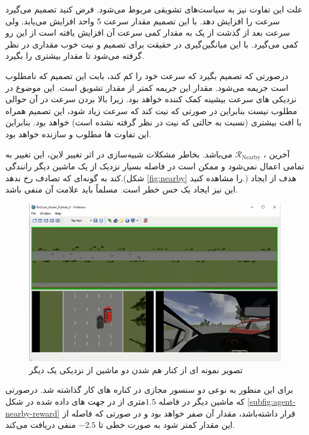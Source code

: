 علت این تفاوت نیز به سیاست‌های تشویقی مربوط می‌شود. فرض کنید  تصمیم می‌گیرد سرعت را افزایش دهد. با این تصمیم مقدار سرعت 5 واحد افزایش می‌یابد. ولی سرعت بعد از گذشت از یک  به مقدار کمی سرعت آن افزایش یافته است از این رو  کمی می‌گیرد. با این میانگین‌گیری در حقیقت برای تصمیم و نیت خوب  مقداری  در نظر گرفته ‌می‌شود تا مقدار  بیشتری را بگیرد. 

درصورتی که  
تصمیم بگیرد که سرعت خود را کم کند، بابت این تصمیم که نامطلوب است جریمه می‌شود. مقدار این جریمه کمتر از مقدار تشویق است. این موضوع در نزدیکی های سرعت بیشینه کمک کننده خواهد بود. زیرا بالا بردن سرعت در آن حوالی مطلوب نیست بنابراین در صورتی که نیت کند که سرعت زیاد شود، این تصمیم  همراه با افت  بیشتری (نسبت به حالتی که نیت در نظر گرفته نشده است) خواهد بود. بنابراین این تفاوت ها مطلوب و سازنده خواهد بود. 



آخرین ، $\mathcal{R}_{\mathrm{Nearby}}$ می‌باشد. بخاطر مشکلات شبیه‌سازی در اثر تغییر لاین، این تغییر به تمامی اعمال نمی‌شود و ممکن است  در فاصله بسیار نزدیک از یک ماشین دیگر رانندگی کند به گونه‌ای که تصادف رخ ندهد.(شکل
\ref{fig:nearby}
را مشاهده کنید.) هدف از ایجاد این  نیز ایجاد یک حس خطر است. مسلماً باید علامت آن منفی باشد. 


\begin{figure}
	\centering
	\includegraphics[width=1\linewidth]{Figures/OBS/nearby}
	\caption{تصویر نمونه ای از کنار هم شدن دو ماشین از نزدیکی یک دیگر}
	\label{fig:obs-nearby}
\end{figure}



برای این منظور به نوعی دو سنسور مجازی در کناره های  کار گذاشته شد.
درصورتی که ماشین دیگر در فاصله $1.5$متری از  در جهت های داده شده در شکل \ref{subfig:agent-nearby-reward} قرار داشته‌باشد، مقدار آن صفر ‌خواهد بود و در صورتی که فاصله از این مقدار کمتر شود به صورت خطی تا $-2.5$  منفی دریافت می‌کند.

